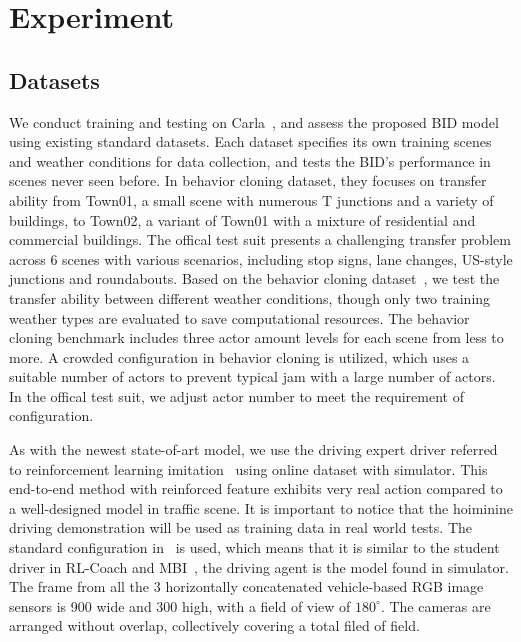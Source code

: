 \section{Experiment}
%	

\subsection{Datasets} \label{sec:Dataset}

\hspace{1pc}We conduct training and testing on Carla~\cite{Dosovitskiy:2017},
and assess the proposed BID model using existing standard datasets\cite{codevilla2019exploring}. 
Each dataset specifies its own training scenes and weather conditions for data collection, 
and tests the BID's performance in scenes never seen before. 
In behavior cloning dataset\cite{codevilla2019exploring}, they focuses on transfer ability from Town01, a small scene with numerous T junctions and a variety of buildings, to Town02, a variant of Town01 with a mixture of residential and commercial buildings.
The offical test suit presents a challenging transfer problem across 6 scenes with various scenarios, including stop signs, lane changes, US-style junctions and roundabouts.
Based on the behavior cloning dataset~\cite{codevilla2019exploring}, we test the transfer ability between different weather conditions, though only two training weather types are evaluated to save computational resources. 
The behavior cloning benchmark includes three actor amount levels for each scene from less to more. 
A crowded configuration in behavior cloning is utilized, which uses a suitable number of actors to prevent typical jam with a large number of actors. 
In the offical test suit, we adjust actor number to meet the requirement of configuration. 


As with the newest state-of-art model, we use the driving expert driver referred to reinforcement learning imitation~\cite{Zhang:2021} using online dataset with simulator.
This end-to-end method with reinforced feature exhibits very real action compared to a well-designed model in traffic scene. 
It is important to notice that the hoiminine driving demonstration will be used as training data in real world tests.
The standard configuration in~\cite{Zhang:2021} is used, which means that it is similar to the student driver in RL-Coach\cite{Zhang:2021} and MBI~\cite{Hu:2022}, the driving agent is the model found in simulator.
The frame from all the 3 horizontally concatenated vehicle-based RGB image sensors is 900 wide and 300 high, with a field of view of $180^{\circ}$.
The cameras are arranged without overlap, collectively covering a total filed of field.


